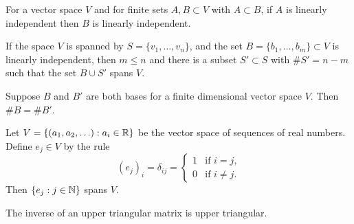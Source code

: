 \documentclass{homework}
\begin{document}
\begin{problem}
  For a vector space $V$ and for finite sets $A, B \subset V$ with
  $A \subset B$, if $A$ is linearly independent then $B$ is linearly
  independent.
\end{problem}

\begin{problem}\label{steinitz-exchange-lemma}If the space $V$ is spanned by $S = \{v_1,\ldots,v_n\}$,
  and the set $B = \{b_1,\ldots,b_m \} \subset V$ is linearly
  independent, then $m \leq n$ and there is a subset $S' \subset S$
  with $\# S' = n-m$ such that the set $B \cup S'$ spans $V$.
\end{problem}

\begin{problem}
  Suppose $B$ and $B'$ are both bases for a finite dimensional vector
  space $V$.  Then $\# B = \# B'$.
\end{problem}

\begin{problem}
  Let $V = \{ (a_1,a_2,\ldots) : a_i \in \mathbb{R} \}$ be the vector space of
  sequences of real numbers.  Define $e_j \in V$ by the rule
  \[
    (e_j)_i = \delta_{ij} = \begin{cases}
      1 & \mbox{if $i = j$,} \\
      0 & \mbox{if $i \neq j$.}
    \end{cases}
  \]
  Then $\{ e_j : j \in \mathbb{N} \}$ spans $V$.
\end{problem}

\begin{problem}
  The inverse of an upper triangular matrix is upper triangular.
\end{problem}
\end{document}
